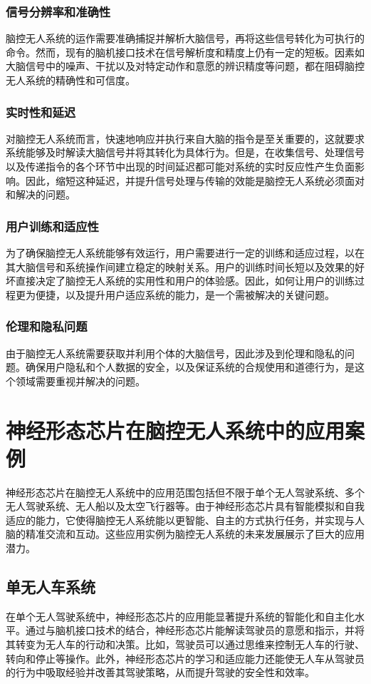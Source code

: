 \documentclass{thuemp}
\begin{document}
\subsubsection{信号分辨率和准确性}
脑控无人系统的运作需要准确捕捉并解析大脑信号，再将这些信号转化为可执行的命令。然而，现有的脑机接口技术在信号解析度和精度上仍有一定的短板。因素如大脑信号中的噪声、干扰以及对特定动作和意愿的辨识精度等问题，都在阻碍脑控无人系统的精确性和可信度。

\subsubsection{实时性和延迟}
对脑控无人系统而言，快速地响应并执行来自大脑的指令是至关重要的，这就要求系统能够及时解读大脑信号并将其转化为具体行为。但是，在收集信号、处理信号以及传递指令的各个环节中出现的时间延迟都可能对系统的实时反应性产生负面影响。因此，缩短这种延迟，并提升信号处理与传输的效能是脑控无人系统必须面对和解决的问题。

\subsubsection{用户训练和适应性}
为了确保脑控无人系统能够有效运行，用户需要进行一定的训练和适应过程，以在其大脑信号和系统操作间建立稳定的映射关系。用户的训练时间长短以及效果的好坏直接决定了脑控无人系统的实用性和用户的体验感。因此，如何让用户的训练过程更为便捷，以及提升用户适应系统的能力，是一个需被解决的关键问题。

\subsubsection{伦理和隐私问题}
由于脑控无人系统需要获取并利用个体的大脑信号，因此涉及到伦理和隐私的问题。确保用户隐私和个人数据的安全，以及保证系统的合规使用和道德行为，是这个领域需要重视并解决的问题。

\section{神经形态芯片在脑控无人系统中的应用案例}
神经形态芯片在脑控无人系统中的应用范围包括但不限于单个无人驾驶系统、多个无人驾驶系统、无人船以及太空飞行器等。由于神经形态芯片具有智能模拟和自我适应的能力，它使得脑控无人系统能以更智能、自主的方式执行任务，并实现与人脑的精准交流和互动。这些应用实例为脑控无人系统的未来发展展示了巨大的应用潜力。

\subsection{单无人车系统}
在单个无人驾驶系统中，神经形态芯片的应用能显著提升系统的智能化和自主化水平。通过与脑机接口技术的结合，神经形态芯片能解读驾驶员的意愿和指示，并将其转变为无人车的行动和决策。比如，驾驶员可以通过思维来控制无人车的行驶、转向和停止等操作。此外，神经形态芯片的学习和适应能力还能使无人车从驾驶员的行为中吸取经验并改善其驾驶策略，从而提升驾驶的安全性和效率。
\end{document}
